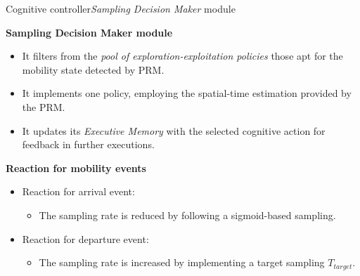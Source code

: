 \begin{frame}{Cognitive controller}{\emph{Sampling Decision Maker} module}
\small
\begin{block}{\small \textbf{Sampling Decision Maker module}}
  \begin{itemize}
      \item It filters from the \emph{pool of exploration-exploitation policies} those apt for the mobility state detected by PRM.
      \item It implements one policy, employing the spatial-time estimation provided by the PRM.
      \item It updates its \emph{Executive Memory} with the selected cognitive action for feedback in further executions.
  \end{itemize}
\end{block}

\begin{block}{\small \textbf{Reaction for mobility events}}
\begin{itemize}
  \item Reaction for arrival event:
  \begin{itemize}
  \item The sampling rate is reduced by following a sigmoid-based sampling.
  \end{itemize}

  \item Reaction for departure event:
  \begin{itemize}
    \item The sampling rate is increased by implementing a target sampling $T_{target}$.
  \end{itemize}
\end{itemize}
\end{block}


\end{frame}
